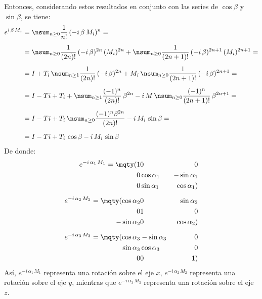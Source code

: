 Entonces, considerando estos resultados en conjunto con las series de $\cos \beta$ y $\sin \beta$, se tiene:
\begin{align}
\begin{aligned}
e^{i \, \beta \, M_{i}} &= \nsum_{n \geq 0} \dfrac{1}{n!} \, (- i \, \beta \, M_{i})^{n} = \\[0.5em]
&= \nsum_{n \geq 0} \dfrac{1}{(2 n)!} \, (- i \, \beta)^{2n} \, (M_{i})^{2n} + \nsum_{n \geq 0} \dfrac{1}{(2 n +1)!} \, (- i \, \beta)^{2n+1} \, (M_{i})^{2n+1} = \\[0.5em]
&= I + T_{i} \, \nsum_{n \geq 1} \dfrac{1}{(2 n)!} \, (- i \, \beta)^{2n} + M_{i} \, \nsum_{n \geq 0} \dfrac{1}{(2 n +1)!} \, (- i \, \beta)^{2n+1} = \\[0.5em]
&= I - T{i} + T_{i} + \nsum_{n \geq 1} \dfrac{(-1)^{n}}{(2 n)!} \, \beta^{2n} - i \, M \, \nsum_{n \geq 0} \dfrac{(-1)^{n}}{(2 n +1)!} \, \beta^{2n+1} = \\[0.5em]
&= I - T{i} + T_{i} \, \nsum_{n \geq 0} \dfrac{(-1)^{n} \beta^{2 n}}{(2 n)!} - i \, M_{i} \, \sin \beta =\\[0.5em]
&= I - T{i} + T_{i} \, \cos \beta - i \, M_{i} \, \sin \beta
\end{aligned}
\label{eq:ecuacion_10_079}
\end{align}
De donde:
\begin{align}
\begin{aligned}
e^{-i \, \alpha_{1} \, M_{1}} = \mqty(1 & 0 & 0 \\ 0 & \cos \alpha_{1} & - \sin \alpha_{1} \\ 0 & \sin \alpha_{1} & \cos \alpha_{1}) \\[0.5em]
e^{-i \, \alpha_{2} \, M_{2}} = \mqty(\cos \alpha_{2} & 0 & \sin \alpha_{2} \\ 0 & 1 & 0 \\ - \sin \alpha_{2} & 0 & \cos \alpha_{2}) \\[0.5em]
e^{-i \, \alpha_{3} \, M_{3}} = \mqty(\cos \alpha_{3} & - \sin \alpha_{3} & 0 \\ \sin \alpha_{3} & \cos \alpha_{3} & 0 \\ 0 & 0 & 1)
\end{aligned}
\label{eq:ecuacion_10_080}
\end{align}
Así, $e^{-i \, \alpha_{1} \, M_{1}}$ representa una rotación sobre el eje $x$, $e^{-i \, \alpha_{2} \, M_{2}}$ representa una rotación sobre el eje $y$, mientras que $e^{-i \, \alpha_{3} \, M_{3}}$ representa una rotación sobre el eje $z$.
\par
